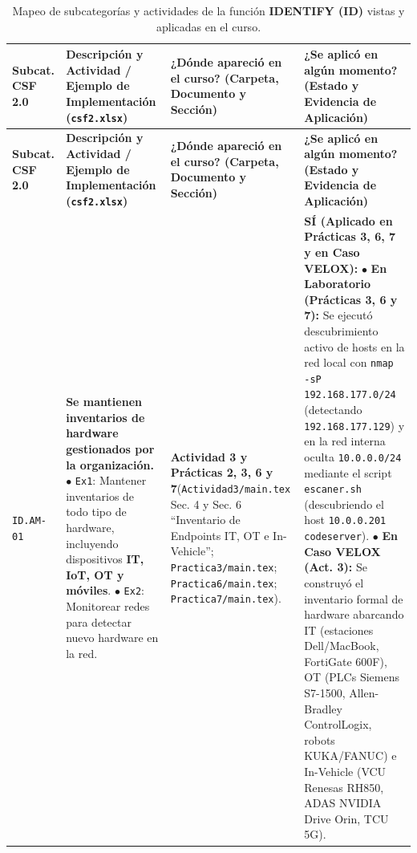 \documentclass[letterpaper,11pt]{article}
\begin{document}
\begingroup
\scriptsize
\setlength{\tabcolsep}{3.5pt}
\renewcommand{\arraystretch}{1.24}
\begin{longtable}{|C{1.5cm}|L{5.3cm}|L{4.3cm}|L{5.8cm}|}
\caption{Mapeo de subcategorías y actividades de la función \textbf{IDENTIFY (ID)} vistas y aplicadas en el curso.}
\label{tab:mapeo-id} \\
\hline
{}
\textbf{Subcat. CSF 2.0} & \textbf{Descripción y Actividad / Ejemplo de Implementación (\texttt{csf2.xlsx})} & \textbf{¿Dónde apareció en el curso? (Carpeta, Documento y Sección)} & \textbf{¿Se aplicó en algún momento? (Estado y Evidencia de Aplicación)} \\
\hline
\endfirsthead
\hline
{}
\textbf{Subcat. CSF 2.0} & \textbf{Descripción y Actividad / Ejemplo de Implementación (\texttt{csf2.xlsx})} & \textbf{¿Dónde apareció en el curso? (Carpeta, Documento y Sección)} & \textbf{¿Se aplicó en algún momento? (Estado y Evidencia de Aplicación)} \\
\hline
\endhead
\hline
\endfoot

\texttt{ID.AM-01} &
\textbf{Se mantienen inventarios de hardware gestionados por la organización.}\newline
$\bullet$ \texttt{Ex1}: Mantener inventarios de todo tipo de hardware, incluyendo dispositivos \textbf{IT, IoT, OT y móviles}.\newline
$\bullet$ \texttt{Ex2}: Monitorear redes para detectar nuevo hardware en la red. &
\textbf{Actividad 3 y Prácticas 2, 3, 6 y 7}\newline (\texttt{Actividad3/main.tex} Sec. 4 y Sec. 6 ``Inventario de Endpoints IT, OT e In-Vehicle''; \texttt{Practica3/main.tex}; \texttt{Practica6/main.tex}; \texttt{Practica7/main.tex}). &
\textbf{SÍ (Aplicado en Prácticas 3, 6, 7 y en Caso VELOX):}\newline
$\bullet$ \textbf{En Laboratorio (Prácticas 3, 6 y 7):} Se ejecutó descubrimiento activo de hosts en la red local con \texttt{nmap -sP 192.168.177.0/24} (detectando \texttt{192.168.177.129}) y en la red interna oculta \texttt{10.0.0.0/24} mediante el script \texttt{escaner.sh} (descubriendo el host \texttt{10.0.0.201} \texttt{codeserver}).\newline
$\bullet$ \textbf{En Caso VELOX (Act. 3):} Se construyó el inventario formal de hardware abarcando IT (estaciones Dell/MacBook, FortiGate 600F), OT (PLCs Siemens S7-1500, Allen-Bradley ControlLogix, robots KUKA/FANUC) e In-Vehicle (VCU Renesas RH850, ADAS NVIDIA Drive Orin, TCU 5G). \\
\hline


\end{longtable}
\end{document}
